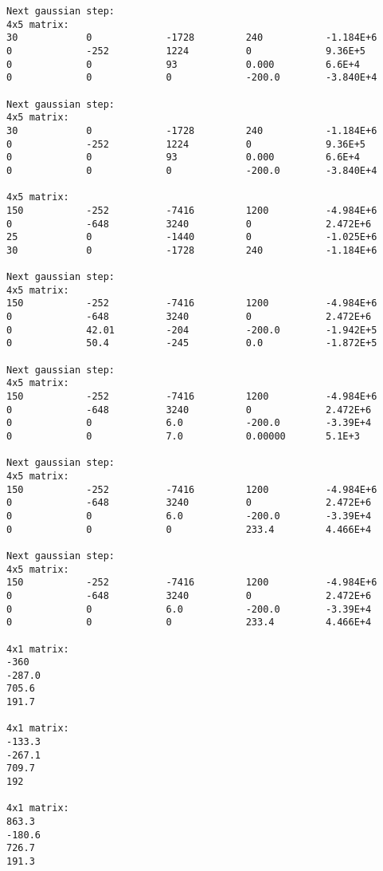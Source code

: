 \documentclass[letterpaper,12pt]{article}
\begin{document}
\begin{verbatim}
Next gaussian step:
4x5 matrix:
30            0             -1728         240           -1.184E+6     
0             -252          1224          0             9.36E+5       
0             0             93            0.000         6.6E+4        
0             0             0             -200.0        -3.840E+4     

Next gaussian step:
4x5 matrix:
30            0             -1728         240           -1.184E+6     
0             -252          1224          0             9.36E+5       
0             0             93            0.000         6.6E+4        
0             0             0             -200.0        -3.840E+4     

4x5 matrix:
150           -252          -7416         1200          -4.984E+6     
0             -648          3240          0             2.472E+6      
25            0             -1440         0             -1.025E+6     
30            0             -1728         240           -1.184E+6     

Next gaussian step:
4x5 matrix:
150           -252          -7416         1200          -4.984E+6     
0             -648          3240          0             2.472E+6      
0             42.01         -204          -200.0        -1.942E+5     
0             50.4          -245          0.0           -1.872E+5     

Next gaussian step:
4x5 matrix:
150           -252          -7416         1200          -4.984E+6     
0             -648          3240          0             2.472E+6      
0             0             6.0           -200.0        -3.39E+4      
0             0             7.0           0.00000       5.1E+3        

Next gaussian step:
4x5 matrix:
150           -252          -7416         1200          -4.984E+6     
0             -648          3240          0             2.472E+6      
0             0             6.0           -200.0        -3.39E+4      
0             0             0             233.4         4.466E+4      

Next gaussian step:
4x5 matrix:
150           -252          -7416         1200          -4.984E+6     
0             -648          3240          0             2.472E+6      
0             0             6.0           -200.0        -3.39E+4      
0             0             0             233.4         4.466E+4      

4x1 matrix:
-360          
-287.0        
705.6         
191.7         

4x1 matrix:
-133.3        
-267.1        
709.7         
192           

4x1 matrix:
863.3         
-180.6        
726.7         
191.3
\end{verbatim}
\end{document}
